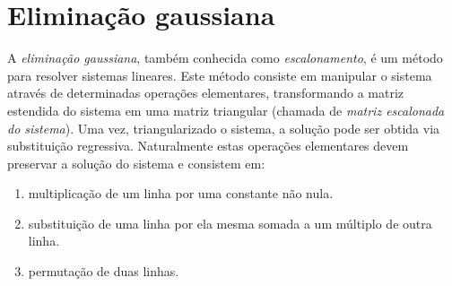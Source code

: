 


\section{Eliminação gaussiana}
A \emph{eliminação gaussiana}, também conhecida como \emph{escalonamento}, é um método para resolver sistemas lineares. Este método consiste em manipular o sistema através de determinadas operações elementares, transformando a matriz estendida do sistema em uma matriz triangular (chamada de \emph{matriz escalonada do sistema}). Uma vez, triangularizado o sistema, a solução pode ser obtida via substituição regressiva. Naturalmente estas operações elementares devem preservar a solução do sistema e consistem em:
\begin{enumerate}
\item multiplicação de um linha por uma constante não nula.
\item substituição de uma linha por ela mesma somada a um múltiplo de outra linha.
\item permutação de duas linhas.
\end{enumerate}

